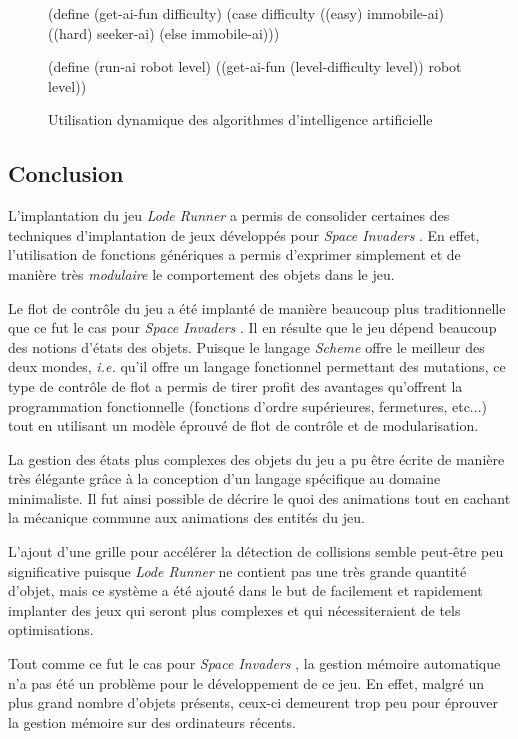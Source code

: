 \documentclass[12pt,twoside,letterpaper,francais]{book}
\newcommand{\ie}{{\textit{i.e. }}}
\newcommand{\lr}{{\textit{Lode Runner }}}
\newcommand{\si}{{\textit{Space Invaders }}}
\newcommand{\Schemelang}{{\textit{Scheme }}}
\begin{document}
\begin{figure}[htb!]
  \begin{schemecode}
(define (get-ai-fun difficulty)
  (case difficulty
    ((easy) immobile-ai)
    ((hard) seeker-ai)
    (else immobile-ai)))

(define (run-ai robot level)
  ((get-ai-fun (level-difficulty level)) robot level))
  \end{schemecode}
  \caption{Utilisation dynamique des algorithmes d'intelligence
    artificielle}
  \label{Exp:dyn-ai}
\end{figure}


\FloatBarrier
\subsection{Conclusion}
L'implantation du jeu \lr a permis de consolider certaines des
techniques d'implantation de jeux développés pour \si. En effet,
l'utilisation de fonctions génériques a permis d'exprimer simplement
et de manière très \emph{modulaire} le comportement des objets dans le
jeu.

Le flot de contrôle du jeu a été implanté de manière beaucoup plus
traditionnelle que ce fut le cas pour \si. Il en résulte que le jeu
dépend beaucoup des notions d'états des objets. Puisque le langage
\Schemelang offre le meilleur des deux mondes, \ie qu'il offre un langage
fonctionnel permettant des mutations, ce type de contrôle de flot a
permis de tirer profit des avantages qu'offrent la programmation
fonctionnelle (fonctions d'ordre supérieures, fermetures, etc...) tout
en utilisant un modèle éprouvé de flot de contrôle et de
modularisation.

La gestion des états plus complexes des objets du jeu a pu être écrite
de manière très élégante grâce à la conception d'un langage spécifique
au domaine minimaliste. Il fut ainsi possible de décrire le \og quoi
\fg des animations tout en cachant la mécanique commune aux animations
des entités du jeu.

L'ajout d'une grille pour accélérer la détection de collisions semble
peut-être peu significative puisque \lr ne contient pas une très
grande quantité d'objet, mais ce système a été ajouté dans le but de
facilement et rapidement implanter des jeux qui seront plus complexes
et qui nécessiteraient de tels optimisations.

Tout comme ce fut le cas pour \si, la gestion mémoire automatique n'a
pas été un problème pour le développement de ce jeu. En effet, malgré
un plus grand nombre d'objets présents, ceux-ci demeurent trop peu
pour éprouver la gestion mémoire sur des ordinateurs récents.
\end{document}
